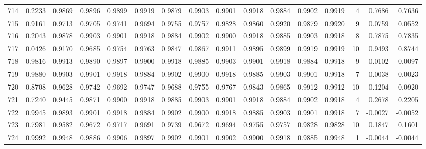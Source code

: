 \begin{tabular}{lrrrrrrrrrrrrrrr}
714 &      0.2233 &  0.9869 &  0.9896 &  0.9899 &  0.9919 &  0.9879 &  0.9903 &  0.9901 &  0.9918 &  0.9884 &   0.9902 &     0.9919 &      4 &                    0.7686 &                     0.7636 \\
715 &      0.9161 &  0.9713 &  0.9705 &  0.9741 &  0.9694 &  0.9755 &  0.9757 &  0.9828 &  0.9860 &  0.9920 &   0.9879 &     0.9920 &      9 &                    0.0759 &                     0.0552 \\
716 &      0.2043 &  0.9878 &  0.9903 &  0.9901 &  0.9918 &  0.9884 &  0.9902 &  0.9900 &  0.9918 &  0.9885 &   0.9903 &     0.9918 &      8 &                    0.7875 &                     0.7835 \\
717 &      0.0426 &  0.9170 &  0.9685 &  0.9754 &  0.9763 &  0.9847 &  0.9867 &  0.9911 &  0.9895 &  0.9899 &   0.9919 &     0.9919 &     10 &                    0.9493 &                     0.8744 \\
718 &      0.9816 &  0.9913 &  0.9890 &  0.9897 &  0.9900 &  0.9918 &  0.9885 &  0.9903 &  0.9901 &  0.9918 &   0.9884 &     0.9918 &      9 &                    0.0102 &                     0.0097 \\
719 &      0.9880 &  0.9903 &  0.9901 &  0.9918 &  0.9884 &  0.9902 &  0.9900 &  0.9918 &  0.9885 &  0.9903 &   0.9901 &     0.9918 &      7 &                    0.0038 &                     0.0023 \\
720 &      0.8708 &  0.9628 &  0.9742 &  0.9692 &  0.9747 &  0.9688 &  0.9755 &  0.9767 &  0.9843 &  0.9865 &   0.9912 &     0.9912 &     10 &                    0.1204 &                     0.0920 \\
721 &      0.7240 &  0.9445 &  0.9871 &  0.9900 &  0.9918 &  0.9885 &  0.9903 &  0.9901 &  0.9918 &  0.9884 &   0.9902 &     0.9918 &      4 &                    0.2678 &                     0.2205 \\
722 &      0.9945 &  0.9893 &  0.9901 &  0.9918 &  0.9884 &  0.9902 &  0.9900 &  0.9918 &  0.9885 &  0.9903 &   0.9901 &     0.9918 &      7 &                   -0.0027 &                    -0.0052 \\
723 &      0.7981 &  0.9582 &  0.9672 &  0.9717 &  0.9691 &  0.9739 &  0.9672 &  0.9694 &  0.9755 &  0.9757 &   0.9828 &     0.9828 &     10 &                    0.1847 &                     0.1601 \\
724 &      0.9992 &  0.9948 &  0.9886 &  0.9906 &  0.9897 &  0.9902 &  0.9901 &  0.9902 &  0.9900 &  0.9918 &   0.9885 &     0.9948 &      1 &                   -0.0044 &                    -0.0044 \\

\end{tabular}
